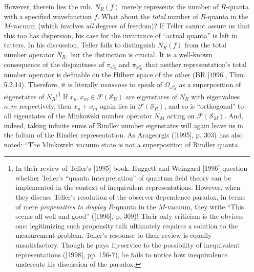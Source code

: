 \documentclass[12pt]{article}
\theoremstyle{remark}
\theoremstyle{definition}
\newcommand{\hil}[1]{\mathcal{#1}}
\begin{document}
However, therein lies the rub.  $N_{R}(f)$ merely 
represents the number of $R$-quanta with a specified wavefunction $f$.  What about 
the \emph{total} number of $R$-quanta in the $M$-vacuum (which 
involves \emph{all} degrees of freedom)?  If Teller 
cannot assure us that this too has dispersion, his case for the 
invariance of ``actual quanta'' is left in tatters.  
In his 
discussion, Teller fails to distinguish $N_{R}(f)$ from the total 
number operator $N_{R}$, but the distinction is crucial.  
It is a well-known consequence of the disjointness of $\pi_{\omega_{R}^{\bowtie}}$ and 
$\pi_{\omega_{M}^{\bowtie}}$ that neither representation's total number operator 
is definable on the Hilbert space of the other (BR [1996], Thm. 5.2.14).  Therefore, it is 
literally \emph{nonsense} to speak of $\Omega_{\omega_{M}^{\bowtie}}$ as a 
superposition of eigenstates of $N_{R}$!\footnote{In their review of Teller's [1995] book, 
Huggett and Weingard [1996] question whether Teller's ``quanta interpretation''
of quantum field theory can be implemented in the context of inequivalent 
representations.  However, when they discuss 
Teller's
resolution of the observer-dependence paradox, in terms of mere 
\emph{propensities to display} $R$-quanta in the $M$-vacuum, they write ``This seems all well and 
good'' ([1996], p. 309)!  Their only criticism is 
the obvious one: legitimizing such propensity talk ultimately 
requires a solution to the measurement problem.  Teller's response to their 
review is equally unsatisfactory.  Though he pays 
lip-service to the possibility of inequivalent representations 
([1998], pp. 156-7), he fails to notice 
how inequivalence undercuts his discussion of the paradox.}  
If $x_{n},x_{m}\in \hil{F}(\hil{S}_{R})$ are
eigenstates of $N_{R}$ with eigenvalues $n,m$
respectively, then $x_{n}+x_{m}$ again lies in
$\hil{F}(\hil{S}_{R})$, 
and so is ``orthogonal'' to all eigenstates of the Minkowski number 
operator $N_{M}$ acting on $\hil{F}(\hil{S}_{M})$.  And, indeed, taking infinite sums of Rindler
number eigenstates will again leave us in the folium of the Rindler
representation.  As Arageorgis ([1995], p. 303) has also noted: ``The
Minkowski vacuum state is not a superposition of Rindler quanta
\end{document}
